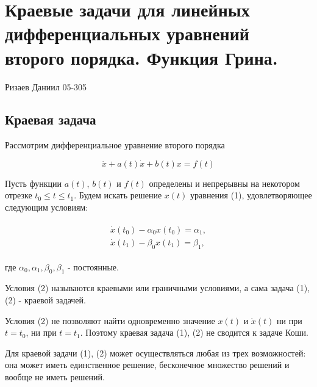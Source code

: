 \documentclass{article}
\theoremstyle{plain} \newtheorem*{theorem*}{Теорема}
\theoremstyle{plain} \newtheorem{theorem}{Теорема}[section]
\theoremstyle{defintition} \newtheorem*{corollary*}{Следствие}
\theoremstyle{plain} \newtheorem*{example*}{Пример}
\theoremstyle{plain} \newtheorem*{remark*}{Замечание}
\begin{document}
\abovedisplayskip=0pt
\belowdisplayskip=10pt
\abovedisplayshortskip=0pt
\belowdisplayshortskip=10pt

\section*{Краевые задачи для линейных дифференциальных уравнений второго порядка. Функция Грина.}
Ризаев Даниил 05-305

\subsection*{Краевая задача}

Рассмотрим дифференциальное уравнение второго порядка

\begin{equation}
    \ddot{x} + a(t)\dot{x} + b(t)x = f(t)
\end{equation}

Пусть функции $a(t)$, $b(t)$ и $f(t)$ определены
и непрерывны на некотором отрезке $t_0 \le t \le t_1$.
Будем искать решение $x(t)$ уравнения (1),
удовлетворяющее следующим условиям:

\begin{gather}
    \begin{split}
        \dot{x}(t_0) - \alpha_0 x(t_0) = \alpha_1, \\
        \dot{x}(t_1) - \beta_0 x(t_1) = \beta_1,
    \end{split}
\end{gather}

где $\alpha_0, \alpha_1, \beta_0, \beta_1$ - постоянные.

Условия (2) называются краевыми или граничными условиями,
а сама задача (1), (2) - краевой задачей.

Условия (2) не позволяют найти одновременно значение
$x(t)$ и $\dot{x}(t)$ ни при $t = t_0$, ни при $t = t_1$.
Поэтому краевая задача (1), (2) не сводится к задаче Коши.

Для краевой задачи (1), (2) может осуществляться
любая из трех возможностей:
она может иметь единственное решение, бесконечное
множество решений и вообще не иметь решений.
\end{document}
